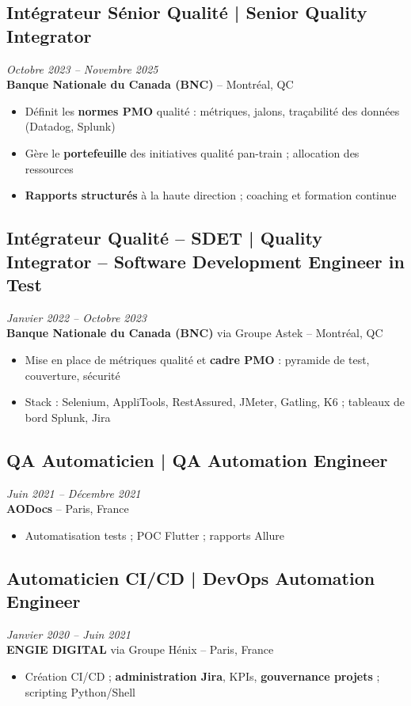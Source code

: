 \documentclass[11pt,a4paper]{article}
\begin{document}
\subsection*{Intégrateur Sénior Qualité | Senior Quality Integrator} \hfill \textit{Octobre 2023 -- Novembre 2025}\\
\textbf{Banque Nationale du Canada (BNC)} -- Montréal, QC\\
\begin{itemize}
    \item Définit les \textbf{normes PMO} qualité : métriques, jalons, traçabilité des données (Datadog, Splunk)
    \item Gère le \textbf{portefeuille} des initiatives qualité pan-train ; allocation des ressources
    \item \textbf{Rapports structurés} à la haute direction ; coaching et formation continue
\end{itemize}

\subsection*{Intégrateur Qualité -- SDET | Quality Integrator -- Software Development Engineer in Test} \hfill \textit{Janvier 2022 -- Octobre 2023}\\
\textbf{Banque Nationale du Canada (BNC)} via Groupe Astek -- Montréal, QC\\
\begin{itemize}
    \item Mise en place de métriques qualité et \textbf{cadre PMO} : pyramide de test, couverture, sécurité
    \item Stack : Selenium, AppliTools, RestAssured, JMeter, Gatling, K6 ; tableaux de bord Splunk, Jira
\end{itemize}

\subsection*{QA Automaticien | QA Automation Engineer} \hfill \textit{Juin 2021 -- Décembre 2021}\\
\textbf{AODocs} -- Paris, France\\
\begin{itemize}
    \item Automatisation tests ; POC Flutter ; rapports Allure
\end{itemize}

\subsection*{Automaticien CI/CD | DevOps Automation Engineer} \hfill \textit{Janvier 2020 -- Juin 2021}\\
\textbf{ENGIE DIGITAL} via Groupe Hénix -- Paris, France\\
\begin{itemize}
    \item Création CI/CD ; \textbf{administration Jira}, KPIs, \textbf{gouvernance projets} ; scripting Python/Shell
\end{itemize}
\end{document}
